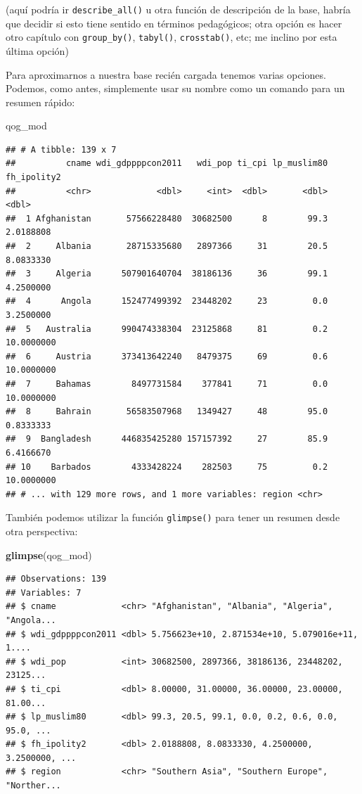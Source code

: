 \documentclass[]{book}
\newenvironment{Shaded}{\begin{snugshade}}{\end{snugshade}}
\newcommand{\KeywordTok}[1]{\textcolor[rgb]{0.13,0.29,0.53}{\textbf{#1}}}
\newcommand{\NormalTok}[1]{#1}
\begin{document}
(aquí podría ir \texttt{describe\_all()} u otra función de descripción
de la base, habría que decidir si esto tiene sentido en términos
pedagógicos; otra opción es hacer otro capítulo con
\texttt{group\_by()}, \texttt{tabyl()}, \texttt{crosstab()}, etc; me
inclino por esta última opción)

Para aproximarnos a nuestra base recién cargada tenemos varias opciones.
Podemos, como antes, simplemente usar su nombre como un comando para un
resumen rápido:

\begin{Shaded}
\begin{Highlighting}[]
\NormalTok{qog_mod}
\end{Highlighting}
\end{Shaded}

\begin{verbatim}
## # A tibble: 139 x 7
##          cname wdi_gdppppcon2011   wdi_pop ti_cpi lp_muslim80 fh_ipolity2
##          <chr>             <dbl>     <int>  <dbl>       <dbl>       <dbl>
##  1 Afghanistan       57566228480  30682500      8        99.3   2.0188808
##  2     Albania       28715335680   2897366     31        20.5   8.0833330
##  3     Algeria      507901640704  38186136     36        99.1   4.2500000
##  4      Angola      152477499392  23448202     23         0.0   3.2500000
##  5   Australia      990474338304  23125868     81         0.2  10.0000000
##  6     Austria      373413642240   8479375     69         0.6  10.0000000
##  7     Bahamas        8497731584    377841     71         0.0  10.0000000
##  8     Bahrain       56583507968   1349427     48        95.0   0.8333333
##  9  Bangladesh      446835425280 157157392     27        85.9   6.4166670
## 10    Barbados        4333428224    282503     75         0.2  10.0000000
## # ... with 129 more rows, and 1 more variables: region <chr>
\end{verbatim}

También podemos utilizar la función \texttt{glimpse()} para tener un
resumen desde otra perspectiva:

\begin{Shaded}
\begin{Highlighting}[]
\KeywordTok{glimpse}\NormalTok{(qog_mod)}
\end{Highlighting}
\end{Shaded}

\begin{verbatim}
## Observations: 139
## Variables: 7
## $ cname             <chr> "Afghanistan", "Albania", "Algeria", "Angola...
## $ wdi_gdppppcon2011 <dbl> 5.756623e+10, 2.871534e+10, 5.079016e+11, 1....
## $ wdi_pop           <int> 30682500, 2897366, 38186136, 23448202, 23125...
## $ ti_cpi            <dbl> 8.00000, 31.00000, 36.00000, 23.00000, 81.00...
## $ lp_muslim80       <dbl> 99.3, 20.5, 99.1, 0.0, 0.2, 0.6, 0.0, 95.0, ...
## $ fh_ipolity2       <dbl> 2.0188808, 8.0833330, 4.2500000, 3.2500000, ...
## $ region            <chr> "Southern Asia", "Southern Europe", "Norther...
\end{verbatim}
\end{document}
